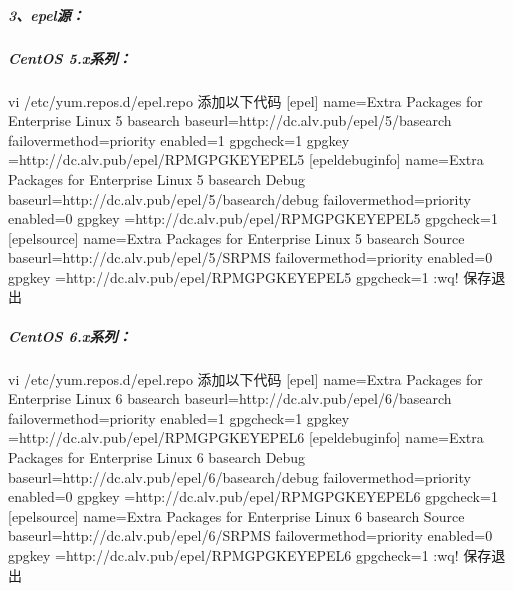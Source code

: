 \documentclass[letterpaper,10pt,english]{sphinxmanual}
\begin{document}
\subparagraph{3、epel源：}
\label{\detokenize{software_manage/yum/yum_official_sync:epel}}

\subparagraph{CentOS 5.x系列：}
\label{\detokenize{software_manage/yum/yum_official_sync:id14}}
%
\begin{sphinxVerbatim}[commandchars=\\\{\}]
vi /etc/yum.repos.d/epel.repo \PYGZsh{}添加以下代码
[epel]
name=Extra Packages for Enterprise Linux 5 \PYGZhy{} \PYGZdl{}basearch
baseurl=http://dc.alv.pub/epel/5/\PYGZdl{}basearch
failovermethod=priority
enabled=1
gpgcheck=1
gpgkey =http://dc.alv.pub/epel/RPM\PYGZhy{}GPG\PYGZhy{}KEY\PYGZhy{}EPEL\PYGZhy{}5
[epel\PYGZhy{}debuginfo]
name=Extra Packages for Enterprise Linux 5 \PYGZhy{} \PYGZdl{}basearch \PYGZhy{} Debug
baseurl=http://dc.alv.pub/epel/5/\PYGZdl{}basearch/debug
failovermethod=priority
enabled=0
gpgkey =http://dc.alv.pub/epel/RPM\PYGZhy{}GPG\PYGZhy{}KEY\PYGZhy{}EPEL\PYGZhy{}5
gpgcheck=1
[epel\PYGZhy{}source]
name=Extra Packages for Enterprise Linux 5 \PYGZhy{} \PYGZdl{}basearch \PYGZhy{} Source
baseurl=http://dc.alv.pub/epel/5/SRPMS
failovermethod=priority
enabled=0
gpgkey =http://dc.alv.pub/epel/RPM\PYGZhy{}GPG\PYGZhy{}KEY\PYGZhy{}EPEL\PYGZhy{}5
gpgcheck=1
:wq! \PYGZsh{}保存退出
\end{sphinxVerbatim}


\subparagraph{CentOS 6.x系列：}
\label{\detokenize{software_manage/yum/yum_official_sync:id15}}
%
\begin{sphinxVerbatim}[commandchars=\\\{\}]
vi /etc/yum.repos.d/epel.repo \PYGZsh{}添加以下代码
[epel]
name=Extra Packages for Enterprise Linux 6 \PYGZhy{} \PYGZdl{}basearch
baseurl=http://dc.alv.pub/epel/6/\PYGZdl{}basearch
failovermethod=priority
enabled=1
gpgcheck=1
gpgkey =http://dc.alv.pub/epel/RPM\PYGZhy{}GPG\PYGZhy{}KEY\PYGZhy{}EPEL\PYGZhy{}6
[epel\PYGZhy{}debuginfo]
name=Extra Packages for Enterprise Linux 6 \PYGZhy{} \PYGZdl{}basearch \PYGZhy{} Debug
baseurl=http://dc.alv.pub/epel/6/\PYGZdl{}basearch/debug
failovermethod=priority
enabled=0
gpgkey =http://dc.alv.pub/epel/RPM\PYGZhy{}GPG\PYGZhy{}KEY\PYGZhy{}EPEL\PYGZhy{}6
gpgcheck=1
[epel\PYGZhy{}source]
name=Extra Packages for Enterprise Linux 6 \PYGZhy{} \PYGZdl{}basearch \PYGZhy{} Source
baseurl=http://dc.alv.pub/epel/6/SRPMS
failovermethod=priority
enabled=0
gpgkey =http://dc.alv.pub/epel/RPM\PYGZhy{}GPG\PYGZhy{}KEY\PYGZhy{}EPEL\PYGZhy{}6
gpgcheck=1
:wq! \PYGZsh{}保存退出
\end{sphinxVerbatim}
\end{document}
